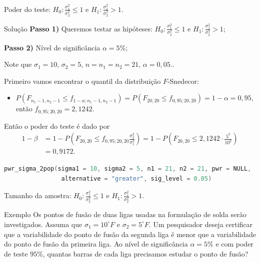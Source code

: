 \documentclass[9pt]{beamer}
\begin{document}
\begin{frame}[fragile]{Poder do teste: $H_0:\frac{\sigma_1^2}{\sigma_2^2} \leq 1$ e $H_1:\frac{\sigma_1^2}{\sigma_2^2} > 1$.}

\begin{block}{Solução}
	\textbf{Passo 1)} Queremos testar as hipóteses: $H_0: \frac{\sigma_1^2}{\sigma_2^2} \leq 1$ e $H_1: \frac{\sigma_1^2}{\sigma_2^2} > 1$;
	
	\textbf{Passo 2)} Nível de significância $\alpha=5\%$;
	
	Note que $\sigma_1=10$, $\sigma_2=5$, $n=n_1=n_2=21$, $\alpha=0,05$..
	
	Primeiro vamos encontrar o quantil da distribuição $F$-Snedecor:
	\begin{itemize}
		\item $P( F_{n_1-1, n_2-1} \leq f_{1-\alpha; n_1-1, n_2-1} ) = P\left( F_{20, 20} \leq f_{0,95; 20, 20} \right) = 1-\alpha = 0,95$, então $f_{0,95; 20, 20} = 2,1242$.
	\end{itemize}

	Então o poder do teste é dado por
	\begin{align*}
		1-\beta &= 1- P \left( F_{20, 20} \leq f_{0,95; 20, 20} \frac{\sigma_2^2}{\sigma_1^2} \right) = 1- P \left( F_{20, 20} \leq 2,1242 \cdot  \frac{5^2}{10^2} \right)\\
		&= 0,9172 .
	\end{align*}
\end{block}

\begin{lstlisting}[language = C, caption = Código no R.]
pwr_sigma_2pop(sigma1 = 10, sigma2 = 5, n1 = 21, n2 = 21, pwr = NULL,
				alternative = "greater", sig_level = 0.05)
\end{lstlisting}

\end{frame}

\begin{frame}{Tamanho da amostra: $H_0:\frac{\sigma_1^2}{\sigma_2^2} \leq 1$ e $H_1:\frac{\sigma_1^2}{\sigma_2^2} > 1$.}

\large
\begin{block}{Exemplo}
	Os pontos de fusão de duas ligas usadas na formulação de solda serão investigados. Assuma que $\sigma_1=10^\circ F$ e $\sigma_2=5^\circ F$. Um pesquisador deseja certificar que a variabilidade do ponto de fusão da segunda liga é menor que a variabilidade do ponto de fusão da primeira liga. Ao nível de significância $\alpha=5\%$ e com poder de teste $95\%$, quantas barras de cada liga precisamos estudar o ponto de fusão?
\end{block}

\normalsize
\end{frame}
\end{document}
